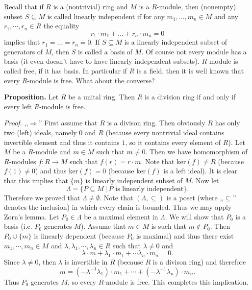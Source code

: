 \documentclass[12pt]{article}
\begin{document}
Recall that if $R$ is a (nontrivial) ring and $M$ is a $R$-module, then (nonempty) subset $S\subseteq M$ is called linearly independent if for any $m_1,\ldots,m_n\in M$ and any $r_1,\cdots, r_n\in R$ the equality
$$r_1\cdot m_1+\ldots +r_n\cdot m_n=0$$
implies that $r_1=\ldots =r_n=0$. If $S\subseteq M$ is a linearly independent subset of generators of $M$, then $S$ is called a basis of $M$. Of course not every module has a basis (it even doesn't have to have linearly independent subsets). $R$-module is called free, if it has basis. In particular if $R$ is a field, then it is well known that every $R$-module is free. What about the converse?

\textbf{Proposition.} Let $R$ be a unital ring. Then $R$ is a division ring if and only if every left $R$-module is free.

\textit{Proof.} ,,$\Rightarrow$'' First assume that $R$ is a divison ring. Then obviously $R$ has only two (left) ideals, namely $0$ and $R$ (because every nontrivial ideal contains invertible element and thus it contains $1$, so it contains every element of $R$). Let $M$ be a $R$-module and $m\in M$ such that $m\neq 0$. Then we have homomorphism of $R$-modules $f:R\to M$ such that $f(r)=r\cdot m$. Note that $\mathrm{ker}(f)\neq R$ (because $f(1)\neq 0$) and thus $\mathrm{ker}(f)=0$ (because $\mathrm{ker}(f)$ is a left ideal). It is clear that this implies that $\{m\}$ is linearly independent subset of $M$. Now let $$\Lambda=\{P\subseteq M\ \big| \ P\mbox{ is linearly independent}\}.$$
Therefore we proved that $\Lambda\neq\emptyset$. Note that $(\Lambda,\subseteq)$ is a poset (where ,,$\subseteq$'' denotes the inclusion) in which every chain is bounded. Thus we may apply Zorn's lemma. Let $P_0\in\Lambda$ be a maximal element in $\Lambda$. We will show that $P_0$ is a basis (i.e. $P_0$ generates $M$). Assume that $m\in M$ is such that $m\not\in P_0$. Then $P_0\cup\{m\}$ is linearly dependent (because $P_0$ is maximal) and thus there exist $m_1,\cdots,m_n\in M$ and $\lambda,\lambda_1,\cdots,\lambda_n\in R$ such that $\lambda\neq 0$ and 
$$ \lambda\cdot m + \lambda_1 \cdot m_1+\cdots \lambda_n \cdot m_n = 0.$$
Since $\lambda\neq 0$, then $\lambda$ is invertible in $R$ (because $R$ is a divison ring) and therefore
$$m=(-\lambda^{-1}\lambda_1)\cdot m_1+\cdots +(-\lambda^{-1}\lambda_n)\cdot m_n.$$
Thus $P_0$ generates $M$, so every $R$-module is free. This completes this implication.
\end{document}
